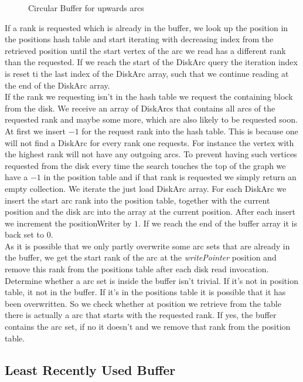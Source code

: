 \begin{figure}[H]
    \centering
    
    \caption{Circular Buffer for upwards arcs}
    \label{fig:circular}
\end{figure}

If a rank is requested which is already in the buffer, we look up the position in the positions hash table and start iterating with decreasing index from the retrieved position until the start vertex of the arc we read has a different rank than the requested.
If we reach the start of the DiskArc query the iteration index is reset ti the last index of the DiskArc array, such that we continue reading at the end of the DiskArc array.
\\
If the rank we requesting isn't in the hash table we request the containing block from the disk.
We receive an array of DiskArcs that contains all arcs of the requested rank and maybe some more, which are also likely to be requested soon.
At first we insert $-1$ for the request rank into the hash table.
This is because one will not find a DiskArc for every rank one requests.
For instance the vertex with the highest rank will not have any outgoing arcs.
To prevent having such vertices requested from the disk every time the search touches the top of the graph we have a $-1$ in the position table and if that rank is requested we simply return an empty collection.
We iterate the just load DiskArc array.
For each DiskArc we insert the start arc rank into the position table, together with the current position and the disk arc into the array at the current position.
After each insert we increment the positionWriter by $1$.
If we reach the end of the buffer array it is back set to $0$.
\\
As it is possible that we only partly overwrite some arc sets that are already in the buffer, we get the start rank of the arc at the \textit{writePointer} position and remove this rank from the positions table after each disk read invocation.
\\ 
Determine whether a arc set is inside the buffer isn't trivial.
If it's not in position table, it not in the buffer.
If it's in the positions table it is possible that it has been overwritten.
So we check whether at position we retrieve from the table there is actually a arc that starts with the requested rank.
If yes, the buffer contains the arc set, if no it doesn't and we remove that rank from the position table.

\subsection{Least Recently Used Buffer}

